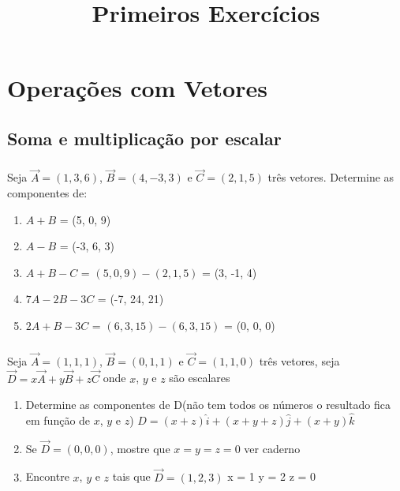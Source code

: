 \documentclass[a4paper,10pt]{article}
\title{Primeiros Exercícios}
\author{}
\begin{document}
\maketitle

\section{Operações com Vetores}

\subsection{Soma e multiplicação por escalar}

\subsubsection{}Seja $\vec{A}=(1,3,6)$, $\vec{B}=(4,-3,3)$ e $\vec{C}=(2,1,5)$ três vetores. Determine as componentes de:

\begin{enumerate}
 \item $A + B$ = 
 (5, 0, 9) 
 
 \item $A - B$ = 
 (-3, 6, 3)
 
 \item $A + B - C$ =
  $(5, 0, 9) - (2, 1, 5)$ = (3, -1, 4)
 
 \item $7A - 2B - 3C$ = 
 (-7, 24, 21)
 
 \item $2A + B - 3C$ = 
 $(6, 3, 15) - (6, 3, 15)$ = (0, 0, 0)

\end{enumerate}

\subsubsection{}Seja $\vec{A}=(1,1,1)$, $\vec{B}=(0,1,1)$ e $\vec{C}=(1,1,0)$ três vetores, seja 
$\vec{D}=x\vec{A} + y\vec{B} + z\vec{C}$ onde $x$, $y$ e $z$ são escalares


\begin{enumerate}
 \item Determine as componentes de D(não tem todos os números o resultado fica em função de $x$, $y$ e $z$)   
 \newline
 $D = (x + z)\hat{i} + (x + y + z)\hat{j} + (x + y)\hat{k}$
 
 
  
 \item Se $\vec{D}=(0,0,0)$, mostre que $x=y=z=0$ 
 \newline
 ver caderno
 
 \item Encontre $x$, $y$ e $z$ tais que $\vec{D}=(1,2,3)$ 
 \newline
 x = 1
 y = 2
 z = 0
 
\end{enumerate}
\end{document}
